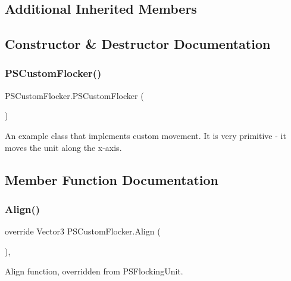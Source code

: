 \subsection*{Additional Inherited Members}


\subsection{Constructor \& Destructor Documentation}
\mbox{\label{class_p_s_custom_flocker_aecf3471651ecc3e957b5144b0e6b9b21}} 
\subsubsection{\texorpdfstring{P\+S\+Custom\+Flocker()}{PSCustomFlocker()}}
{\footnotesize\ttfamily P\+S\+Custom\+Flocker.\+P\+S\+Custom\+Flocker (\begin{DoxyParamCaption}{ }\end{DoxyParamCaption})}

An example class that implements custom movement. It is very primitive -\/ it moves the unit along the x-\/axis. 

\subsection{Member Function Documentation}
\mbox{\label{class_p_s_custom_flocker_a50d8ac4146196420bcf1181289a27e40}} 
\subsubsection{\texorpdfstring{Align()}{Align()}}
{\footnotesize\ttfamily override Vector3 P\+S\+Custom\+Flocker.\+Align (\begin{DoxyParamCaption}{ }\end{DoxyParamCaption})\hspace{0.3cm}{\ttfamily [protected]}, {\ttfamily [virtual]}}



Align function, overridden from P\+S\+Flocking\+Unit. 

